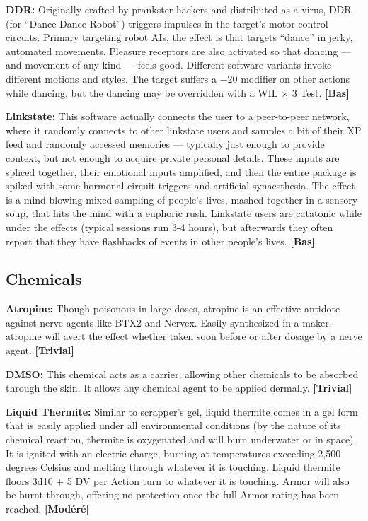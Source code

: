 {{\textbf{DDR:} Originally crafted by prankster hackers and distributed as a virus, DDR (for ``Dance Dance Robot'') triggers impulses in the target’s motor control circuits. Primary targeting robot AIs, the effect is that targets ``dance'' in jerky, automated movements. Pleasure receptors are also activated so that dancing --- and movement of any kind --- feels good. Different software variants invoke different motions and styles. The target suffers a $-$20 modifier on other actions while dancing, but the dancing may be overridden with a WIL $\times$ 3 Test. \textbf{[Bas]} 

\textbf{Linkstate:} This software actually connects the user to a peer-to-peer network, where it randomly connects to other linkstate users and samples a bit of their XP feed and randomly accessed memories --- typically just enough to provide context, but not enough to acquire private personal details. These inputs are spliced together, their emotional inputs amplified, and then the entire package is spiked with some hormonal circuit triggers and artificial synaesthesia. The effect is a mind-blowing mixed sampling of people’s lives, mashed together in a sensory soup, that hits the mind with a euphoric rush. Linkstate users are catatonic while under the effects (typical sessions run 3-4 hours), but afterwards they often report that they have flashbacks of events in other people’s lives. \textbf{[Bas]} 



\subsection{Chemicals} \label{sec:chemicals} 

\textbf{Atropine:} Though poisonous in large doses, atropine is an effective antidote against nerve agents like BTX2 and Nervex. Easily synthesized in a maker, atropine will avert the effect whether taken soon before or after dosage by a nerve agent. \textbf{[Trivial]} 

\textbf{DMSO:} This chemical acts as a carrier, allowing other chemicals to be absorbed through the skin. It allows any chemical agent to be applied dermally. \textbf{[Trivial]} 

\textbf{Liquid Thermite:} Similar to scrapper’s gel, liquid thermite comes in a gel form that is easily applied under all environmental conditions (by the nature of its chemical reaction, thermite is oxygenated and will burn underwater or in space). It is ignited with an electric charge, burning at temperatures exceeding 2,500 degrees Celsius and melting through whatever it is touching. Liquid thermite floors 3d10 + 5 DV per Action turn to whatever it is touching. Armor will also be burnt through, offering no protection once the full Armor rating has been reached. \textbf{[Modéré]} 

}}
